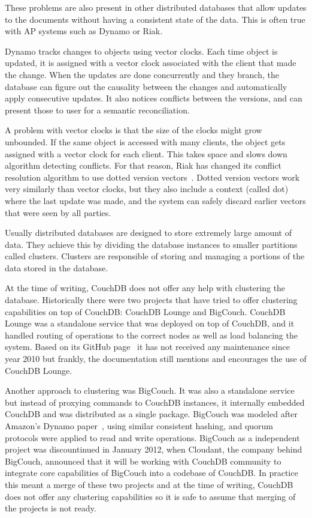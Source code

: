 These problems are also present in other distributed databases that allow
updates to the documents without having a consistent state of the data. This is
often true with AP systems such as Dynamo or Riak.

Dynamo tracks changes to objects using vector clocks. Each time object is
updated, it is assigned with a vector clock associated with the client that made
the change. When the updates are done concurrently and they branch, the database
can figure out the causality between the changes and automatically apply
consecutive updates. It also notices conflicts between the versions, and can
present those to user for a semantic reconciliation.

A problem with vector clocks is that the size of the clocks might grow
unbounded. If the same object is accessed with many clients, the object gets
assigned with a vector clock for each client. This takes space and slows down
algorithm detecting conflicts. For that reason, Riak has changed its conflict
resolution algorithm to use dotted version vectors~\cite{preguicca2010dotted}.
Dotted version vectors work very similarly than vector clocks, but they also
include a context (called dot) where the last update was made, and the system
can safely discard earlier vectors that were seen by all parties.

Usually distributed databases are designed to store extremely large amount of
data. They achieve this by dividing the database instances to smaller partitions
called clusters. Clusters are responsible of storing and managing a portions of
the data stored in the database.

At the time of writing, CouchDB does not offer any help with clustering the
database. Historically there were two projects that have tried to offer
clustering capabilities on top of CouchDB\@: CouchDB Lounge and BigCouch.
CouchDB Lounge was a standalone service that was deployed on top of CouchDB, and
it handled routing of operations to the correct nodes as well as load balancing
the system. Based on its GitHub page~\cite{couchdbloungegithub} it has not
received any maintenance since year 2010 but frankly, the documentation still
mentions and encourages the use of CouchDB Lounge.

Another approach to clustering was BigCouch. It was also a standalone service
but instead of proxying commands to CouchDB instances, it internally embedded
CouchDB and was distributed as a single package. BigCouch was modeled after
Amazon's Dynamo paper~\cite{decandia2007dynamo}, using similar consistent
hashing, and quorum protocols were applied to read and write operations.
BigCouch as a independent project was discountinued in January 2012, when
Cloudant, the company behind BigCouch, announced that it will be working with
CouchDB community to integrate core capabilities of BigCouch into a codebase of
CouchDB\@. In practice this meant a merge of these two projects and at the time
of writing, CouchDB does not offer any clustering capabilities so it is safe to
assume that merging of the projects is not ready.
